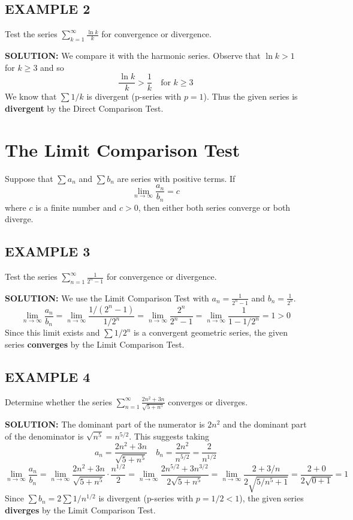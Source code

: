 \documentclass{article}
\begin{document}
\subsection*{EXAMPLE 2}
Test the series \( \sum_{k=1}^{\infty} \frac{\ln k}{k} \) for convergence or divergence.

\textbf{SOLUTION:}
We compare it with the harmonic series. Observe that $\ln k > 1$ for $k \ge 3$ and so
\[ \frac{\ln k}{k} > \frac{1}{k} \quad \text{for } k \ge 3 \]
We know that $\sum 1/k$ is divergent (p-series with $p=1$). Thus the given series is \textbf{divergent} by the Direct Comparison Test.

\section*{The Limit Comparison Test}
\begin{tcolorbox}[
    colback=white,
    colframe=orange!80!white,
    title=The Limit Comparison Test,
    boxrule=0.5mm,
    arc=3mm
    ]
    Suppose that \( \sum a_n \) and \( \sum b_n \) are series with positive terms. If
    \[ \lim_{n \to \infty} \frac{a_n}{b_n} = c \]
    where \( c \) is a finite number and \( c > 0 \), then either both series converge or both diverge.
\end{tcolorbox}

\subsection*{EXAMPLE 3}
Test the series \( \sum_{n=1}^{\infty} \frac{1}{2^n - 1} \) for convergence or divergence.

\textbf{SOLUTION:}
We use the Limit Comparison Test with $a_n = \frac{1}{2^n - 1}$ and $b_n = \frac{1}{2^n}$.
\[ \lim_{n \to \infty} \frac{a_n}{b_n} = \lim_{n \to \infty} \frac{1/(2^n - 1)}{1/2^n} = \lim_{n \to \infty} \frac{2^n}{2^n - 1} = \lim_{n \to \infty} \frac{1}{1 - 1/2^n} = 1 > 0 \]
Since this limit exists and $\sum 1/2^n$ is a convergent geometric series, the given series \textbf{converges} by the Limit Comparison Test.

\subsection*{EXAMPLE 4}
Determine whether the series \( \sum_{n=1}^{\infty} \frac{2n^2 + 3n}{\sqrt{5 + n^5}} \) converges or diverges.

\textbf{SOLUTION:}
The dominant part of the numerator is $2n^2$ and the dominant part of the denominator is $\sqrt{n^5} = n^{5/2}$. This suggests taking
\[ a_n = \frac{2n^2 + 3n}{\sqrt{5 + n^5}} \quad b_n = \frac{2n^2}{n^{5/2}} = \frac{2}{n^{1/2}} \]
\[ \lim_{n \to \infty} \frac{a_n}{b_n} = \lim_{n \to \infty} \frac{2n^2 + 3n}{\sqrt{5 + n^5}} \cdot \frac{n^{1/2}}{2} = \lim_{n \to \infty} \frac{2n^{5/2} + 3n^{3/2}}{2\sqrt{5 + n^5}} = \lim_{n \to \infty} \frac{2 + 3/n}{2\sqrt{5/n^5 + 1}} = \frac{2+0}{2\sqrt{0+1}} = 1 \]
Since $\sum b_n = 2\sum 1/n^{1/2}$ is divergent (p-series with $p = 1/2 < 1$), the given series \textbf{diverges} by the Limit Comparison Test.
\end{document}
